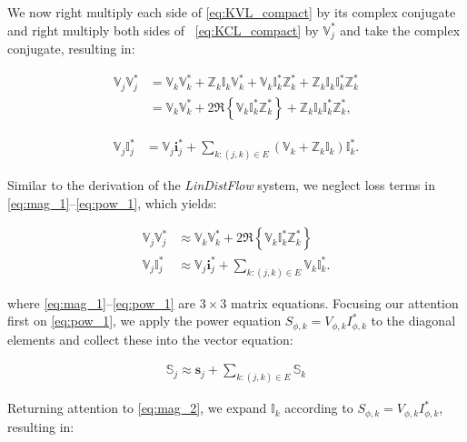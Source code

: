 We now right multiply each side of \eqref{eq:KVL_compact} by its complex conjugate and right multiply both sides of ~\eqref{eq:KCL_compact} by $\mathbb{V}_{j}^{*}$ and take the complex conjugate, resulting in:

\begin{align}
	\mathbb{V}_{j} \mathbb{V}_{j}^*  & =  \mathbb{V}_{k} \mathbb{V}_{k}^* + \mathbb{Z}_{k} \mathbb{I}_{k} \mathbb{V}_{k}^* + \mathbb{V}_{k} \mathbb{I}_{k}^{*} \mathbb{Z}_{k}^{*} + \mathbb{Z}_{k} \mathbb{I}_{k} \mathbb{I}_{k}^{*} \mathbb{Z}_{k}^{*} \nonumber \\
    & = \mathbb{V}_{k} \mathbb{V}_{k}^* + 2 \Re \left\{\mathbb{V}_{k} \mathbb{I}_{k}^{*} \mathbb{Z}_{k}^{*} \right\} + \mathbb{Z}_{k} \mathbb{I}_{k} \mathbb{I}_{k}^{*} \mathbb{Z}_{k}^{*}
\label{eq:mag_1},
\end{align}


\begin{align}
	\mathbb{V}_{j}\mathbb{I}_{j}^{*} &= \mathbb{V}_{j}\mathbf{i}_{j}^{*} + \sum_{k:(j,k) \in E} \left(\mathbb{V}_{k} + \mathbb{Z}_{k}\mathbb{I}_{k}\right)\mathbb{I}_{k}^{*} \label{eq:pow_1}.
\end{align}

Similar to the derivation of the \emph{LinDistFlow} system, we neglect loss terms in \eqref{eq:mag_1}--\eqref{eq:pow_1}, which yields:

\begin{align}
    \mathbb{V}_{j}\mathbb{V}_{j}^{*} &\approx \mathbb{V}_{k} \mathbb{V}_{k}^* + 2 \Re \left\{\mathbb{V}_{k} \mathbb{I}_{k}^{*} \mathbb{Z}_{k}^{*} \right\} \label{eq:mag_2} \\
	\mathbb{V}_{j}\mathbb{I}_{j}^{*} &\approx \mathbb{V}_{j}\mathbf{i}_{j}^{*} + \sum_{k:(j,k) \in E} \mathbb{V}_{k}\mathbb{I}_{k}^{*} \label{eq:pow_2}.
\end{align}

\noindent where \eqref{eq:mag_1}--\eqref{eq:pow_1} are $3\times 3$ matrix equations. Focusing our attention first on \eqref{eq:pow_1}, we apply the power equation $S_{\phi,k} = V_{\phi,k}I_{\phi,k}^{*}$ to the diagonal elements and collect these into the vector equation:

\begin{align}
	\mathbb{S}_{j} \approx \mathbf{s}_{j} + \sum_{k:(j,k) \in E} \mathbb{S}_{k} \label{eq:pow_3}
\end{align}

Returning attention to \eqref{eq:mag_2}, we expand $\mathbb{I}_{k}$ according to $S_{\phi,k} = V_{\phi,k}I_{\phi,k}^{*}$, resulting in:

